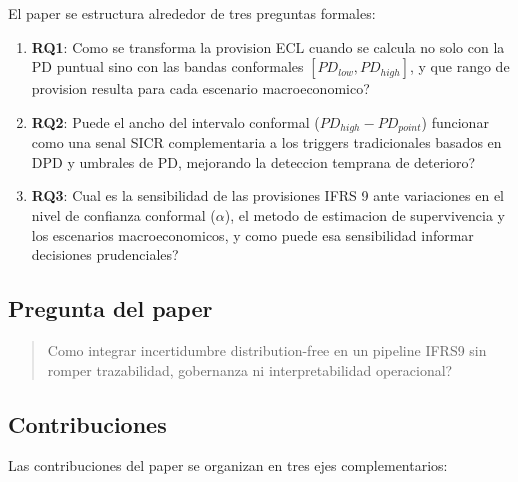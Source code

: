 \documentclass[
  spanish,
  11pt,
  letterpaper,
]{scrbook}
\providecommand{\tightlist}{%
  \setlength{\itemsep}{0pt}\setlength{\parskip}{0pt}}
\theoremstyle{plain}
\theoremstyle{remark}
\begin{document}
El paper se estructura alrededor de tres preguntas formales:

\begin{enumerate}
\def\labelenumi{\arabic{enumi}.}
\tightlist
\item
  \textbf{RQ1}: Como se transforma la provision ECL cuando se calcula no
  solo con la PD puntual sino con las bandas conformales
  \([PD_{low}, PD_{high}]\), y que rango de provision resulta para cada
  escenario macroeconomico?
\item
  \textbf{RQ2}: Puede el ancho del intervalo conformal
  (\(PD_{high} - PD_{point}\)) funcionar como una senal SICR
  complementaria a los triggers tradicionales basados en DPD y umbrales
  de PD, mejorando la deteccion temprana de deterioro?
\item
  \textbf{RQ3}: Cual es la sensibilidad de las provisiones IFRS 9 ante
  variaciones en el nivel de confianza conformal (\(\alpha\)), el metodo
  de estimacion de supervivencia y los escenarios macroeconomicos, y
  como puede esa sensibilidad informar decisiones prudenciales?
\end{enumerate}

\subsection{Pregunta del paper}\label{pregunta-del-paper}

\begin{quote}
Como integrar incertidumbre distribution-free en un pipeline IFRS9 sin
romper trazabilidad, gobernanza ni interpretabilidad operacional?
\end{quote}

\subsection{Contribuciones}\label{sec-p2-contributions}

Las contribuciones del paper se organizan en tres ejes complementarios:
\end{document}
